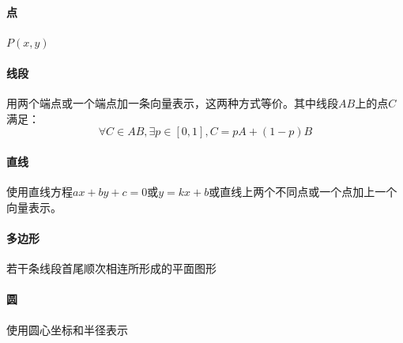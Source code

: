 \documentclass[]{cpp}
\begin{document}
\paragraph{点} $P(x,y)$
\paragraph{线段}
	用两个端点或一个端点加一条向量表示，这两种方式等价。其中线段$AB$上的点$C$满足：$$\forall C \in AB,\exists p \in [0,1],C=pA+(1-p)B$$
\paragraph{直线}
	使用直线方程$ax+by+c=0$或$y=kx+b$或直线上两个不同点或一个点加上一个向量表示。
\paragraph{多边形} 若干条线段首尾顺次相连所形成的平面图形
\paragraph{圆} 使用圆心坐标和半径表示
\end{document}
